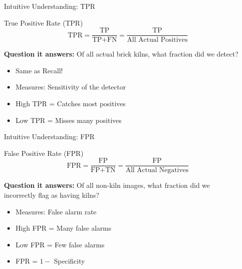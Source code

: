 \documentclass{beamer}
\begin{document}
\begin{frame}{Intuitive Understanding: TPR}
\begin{examplebox}{True Positive Rate (TPR)}
\small
$$\text{TPR} = \frac{\text{TP}}{\text{TP} + \text{FN}} = \frac{\text{TP}}{\text{All Actual Positives}}$$

\vspace{0.2cm}

\textbf{Question it answers:}
Of all actual brick kilns, what fraction did we detect?
\end{examplebox}

\vspace{0.15cm}

\begin{itemize}
    \item Same as Recall!
    \item Measures: Sensitivity of the detector
    \item High TPR = Catches most positives
    \item Low TPR = Misses many positives
\end{itemize}
\end{frame}

\begin{frame}{Intuitive Understanding: FPR}
\begin{examplebox}{False Positive Rate (FPR)}
\small
$$\text{FPR} = \frac{\text{FP}}{\text{FP} + \text{TN}} = \frac{\text{FP}}{\text{All Actual Negatives}}$$

\vspace{0.2cm}

\textbf{Question it answers:}
Of all non-kiln images, what fraction did we \\
incorrectly flag as having kilns?
\end{examplebox}

\vspace{0.15cm}

\begin{itemize}
    \item Measures: False alarm rate
    \item High FPR = Many false alarms
    \item Low FPR = Few false alarms
    \item FPR = $1 - $ Specificity
\end{itemize}
\end{frame}
\end{document}
